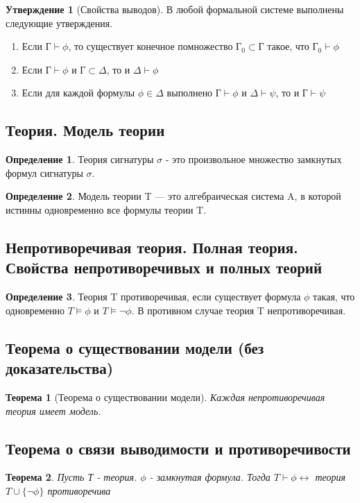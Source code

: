 \documentclass[a4paper]{article}
\newtheorem{theorem}{Теорема}[section]
\theoremstyle{definition}
\newtheorem*{definition}{Определение}
\newtheorem*{statement}{Утверждение}
\theoremstyle{remark}
\begin{document}
	\begin{statement}[Свойства выводов]
		В любой формальной системе выполнены следующие утверждения.
		\begin{enumerate}
			\item Если $Г \vdash \phi$, то существует конечное помножество $Г_0 \subset Г$ такое, что $Г_0 \vdash \phi$
			\item Если $Г \vdash \phi$ и $Г \subset \Delta$, то и $\Delta \vdash \phi$
			\item Если для каждой формулы $\phi \in \Delta$ выполнено $Г \vdash \phi$ и $\Delta \vdash \psi$, то и $Г \vdash \psi$
		\end{enumerate}
	\end{statement}
    \subsection{Теория. Модель теории}
    \begin{definition}
        Теория сигнатуры $\sigma$ - это произвольное множество замкнутых формул сигнатуры  $\sigma$.
    \end{definition}
    \begin{definition}
        Модель теории T — это алгебраическая система A, в которой истинны одновременно все 
    формулы теории T.
    \end{definition}
    \subsection{Непротиворечивая теория. Полная теория. Свойства непротиворечивых и полных теорий}
    \begin{definition}
        Теория T противоречивая, если существует формула $\phi$ такая, что одновременно 
    $T \models \phi$ и $T \models \neg\phi$. В противном случае теория T непротиворечивая.
    \end{definition}
    \subsection{Теорема о существовании модели (без доказательства)}
    \begin{theorem}[Теорема о существовании модели]
        Каждая непротиворечивая теория имеет модель. 
    \end{theorem}
    \subsection{Теорема о связи выводимости и противоречивости}
	\begin{theorem}
		Пусть Т - теория. $\phi$ - замкнутая формула. Тогда $T \vdash \phi \leftrightarrow$ теория $T \cup \{\neg\phi\}$ противоречива
	\end{theorem}
\end{document}
